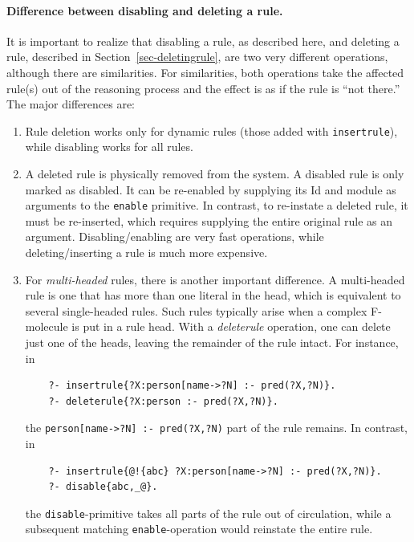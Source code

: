 \documentclass[11pt]{article}
\begin{document}
\paragraph{Difference between disabling and deleting a rule.}
It is important to realize that disabling a rule, as described here,
and deleting a rule, described in Section~\ref{sec-deletingrule}, are
two very different operations, although there are similarities.
For similarities, both operations take the affected rule(s) out of the
reasoning process and the effect is as if the rule is ``not there.''
The major differences are:
\begin{enumerate}
\item  Rule deletion works only for dynamic rules (those added with
  \texttt{insertrule}), while disabling works for all rules.
\item  A deleted rule is physically removed from the system. A disabled
  rule is only marked as disabled. It can be re-enabled by supplying its Id
  and module as arguments to the \texttt{enable} primitive. In contrast,
  to re-instate a deleted rule, it must be re-inserted, which requires supplying
  the entire original rule as an argument. Disabling/enabling are very fast
  operations, while deleting/inserting a rule is much more expensive.
\item For \emph{multi-headed} rules, there is another important difference. 
  A multi-headed rule is one that has more than one literal in the head,
  which is equivalent to several single-headed rules. Such rules
  typically arise when a complex F-molecule is put in a rule head.
   With a \emph{deleterule} operation, one can delete just one of the
   heads, leaving the remainder of the rule intact. For instance, in
\begin{verbatim}
    ?- insertrule{?X:person[name->?N] :- pred(?X,?N)}.
    ?- deleterule{?X:person :- pred(?X,?N)}.
\end{verbatim}
   the \verb|person[name->?N] :- pred(?X,?N)| part of the rule remains. In
   contrast, in
\begin{verbatim}
    ?- insertrule{@!{abc} ?X:person[name->?N] :- pred(?X,?N)}.
    ?- disable{abc,_@}.
\end{verbatim}
   the \texttt{disable}-primitive takes all parts of the rule out of
   circulation, while a subsequent matching
   \texttt{enable}-operation would reinstate the
   entire rule. 
\end{enumerate}
\end{document}
